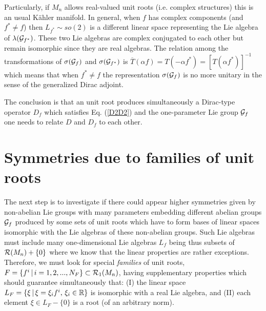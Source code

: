 \documentclass[a4paper,12pt]{article}
\begin{document}
Particularly, if $M_n$ allows real-valued unit roots (i.e. complex structures) 
this is an usual K\" ahler manifold. In general, when $f$ has complex 
components (and $f^*\not=f$) then $L_{f^*}\sim so(2)$ is a different linear 
space representing the Lie algebra of $\lambda({\cal G}_{f^*})$. These two Lie 
algebras are complex conjugated to each other but remain isomorphic since 
they are real algebras.  
The relation among the transformations of $\sigma({\cal G}_{f})$ and 
$\sigma({\cal G}_{f^*})$ is
$\overline{T}(\alpha f)=T(-\alpha f^*)=[T(\alpha f^*)]^{-1}$ 
which means that when $f^*\not=f$ the representation $\sigma({\cal G}_f)$ is 
no more unitary in the sense of the generalized Dirac adjoint. 

The conclusion is that an unit root produces simultaneously a Dirac-type 
operator $D_f$ which satisfies Eq. (\ref{D2D2}) and the one-parameter  
Lie group ${\cal G}_f$ one needs to relate $D$ and $D_f$ to each 
other.  
   
\section{Symmetries due to families of unit roots}

The next step is to investigate if there could appear higher symmetries 
given by non-abelian Lie groups with many parameters embedding different 
abelian groups ${\cal G}_f$ produced by some sets of unit roots which have to 
form bases of linear spaces isomorphic with the Lie algebras of these 
non-abelian groups. Such Lie algebras must include many one-dimensional Lie 
algebras $L_f$ being thus subsets of ${\cal R}(M_n)+\{0\}$ where we know that 
the linear properties are rather exceptions. Therefore, we must look for 
special {\em families} of unit roots, $F=\{f^i\,|\,i=1,2,...,N_F\}\subset 
{\cal R}_1(M_n)$, having supplementary  properties which should guarantee 
simultaneously that: 
(I) the linear space $L_{F}=\{\xi\,|\,\xi=\xi_i f^i,\, \xi_i\in {\Bbb R}\}$ 
is isomorphic with a real Lie algebra, and (II) each element 
$\xi\in L_{F}-\{0\}$ is a root (of an arbitrary norm). 
\end{document}
